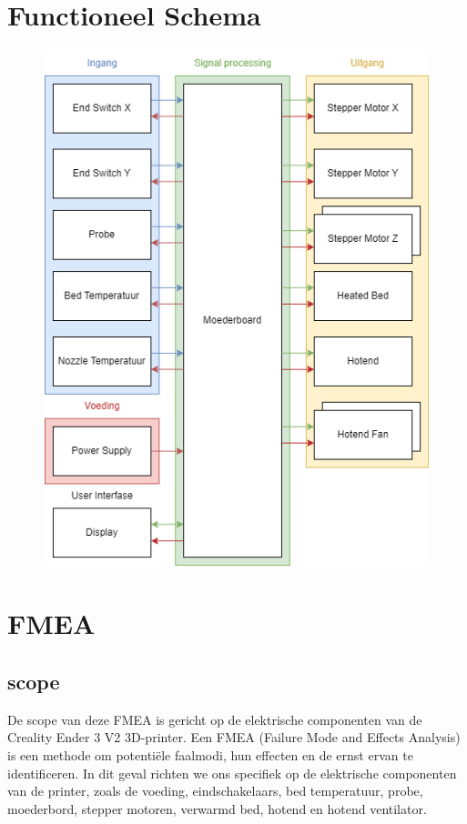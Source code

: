 \documentclass{article}
\begin{document}
\newpage
\section{Functioneel Schema}

\begin{figure}[H]
  \centering
  \includegraphics[width=\textwidth]{Creality Ender V2.drawio.png}
\end{figure}


\newpage
\section{FMEA}
\subsection{scope}
De scope van deze FMEA is gericht op de elektrische componenten van de Creality Ender 3 V2 3D-printer. Een FMEA (Failure Mode and Effects Analysis) is een methode om potentiële faalmodi, hun effecten en de ernst ervan te identificeren. In dit geval richten we ons specifiek op de elektrische componenten van de printer, zoals de voeding, eindschakelaars, bed temperatuur, probe, moederbord, stepper motoren, verwarmd bed, hotend en hotend ventilator.
\end{document}
